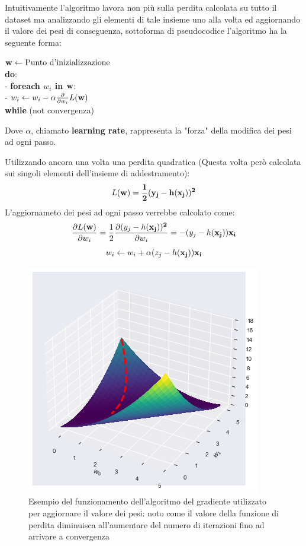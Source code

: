 \documentclass[../../main.tex]{subfiles}
\begin{document}
    Intuitivamente l'algoritmo lavora non più sulla perdita calcolata su tutto il dataset ma analizzando gli elementi di tale insieme uno alla volta ed aggiornando il valore dei pesi di conseguenza, sottoforma di pseudocodice l'algoritmo ha la seguente forma:

    $\bf{w} \leftarrow \text{Punto d'inizializzazione}$\\
    \textbf{do}:\\
    - \quad \textbf{foreach $w_i$ in $\bf{w}$}:\\
    - \quad \quad $w_i \leftarrow w_i - \alpha \frac{\partial}{\partial w_i} L(\bf{w})$\\
    \textbf{while} (not convergenza)

    Dove $\alpha$, chiamato \textbf{learning rate}, rappresenta la "forza" della modifica dei pesi ad ogni passo.

    Utilizzando ancora una volta una perdita quadratica (Questa volta però calcolata sui singoli elementi dell'insieme di addestramento):
    \[L(\bf{w}) = \frac{1}{2}(y_j - h(\bf{x_j}))^2\]
    L'aggiornameto dei pesi ad ogni passo verrebbe calcolato come:
    \[\frac{\partial L(\bf{w})}{\partial w_i} = \frac{1}{2}\frac{\partial(y_j - h(\bf{x_j}))^2}{\partial w_i} = - (y_j - h(\bf{x_j})) x_i\]
    \[w_i \leftarrow w_i + \alpha (z_j - h(\bf{x_j})) x_i\]
    \begin{figure}[H]
        \centering
        \includegraphics[scale = 0.6]{immagini/4_1/loss_function.png}
        \caption{Esempio del funzionamento dell'algoritmo del gradiente utilizzato per aggiornare il valore dei pesi: noto come il valore della funzione di perdita diminuisca all'aumentare del numero di iterazioni fino ad arrivare a convergenza}
        \label{fig:gradient_descent}
    \end{figure}
   
\end{document}
